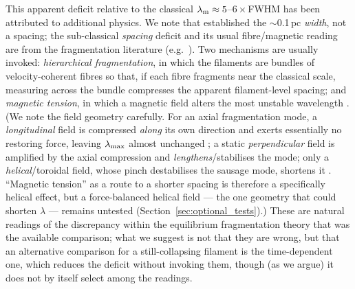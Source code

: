 \documentclass[usenatbib,twoside,twocolumn]{mnras}
\begin{document}
This apparent deficit relative to the classical $\lambda_{\rm m}\approx5$--$6\times$FWHM has been attributed to additional physics. We note that \citet{Arzoumanian2019} established the $\sim$0.1\,pc \emph{width}, not a spacing; the sub-classical \emph{spacing} deficit and its usual fibre/magnetic reading are from the fragmentation literature (e.g.\ \citealt{Fischera2012,Zhang2023cal}). Two mechanisms are usually invoked: \emph{hierarchical fragmentation}, in which the filaments are bundles of velocity-coherent fibres \citep{Hacar2013,Hacar2018,Yang2024} so that, if each fibre fragments near the classical scale, measuring across the bundle compresses the apparent filament-level spacing; and \emph{magnetic tension}, in which a magnetic field alters the most unstable wavelength \citep{Nakamura1993}. (We note the field geometry carefully. For an axial fragmentation mode, a \emph{longitudinal} field is compressed \emph{along} its own direction and exerts essentially no restoring force, leaving $\lambda_{\rm max}$ almost unchanged \citep[][consistent with our $\theta=0^\circ$ runs being nearly $\beta$-independent]{Nagasawa1987,Nakamura1993}; a static \emph{perpendicular} field is amplified by the axial compression and \emph{lengthens}/stabilises the mode; only a \emph{helical}/toroidal field, whose pinch destabilises the sausage mode, shortens it \citep{Fiege2000}. ``Magnetic tension'' as a route to a shorter spacing is therefore a specifically helical effect, but a force-balanced helical field --- the one geometry that could shorten $\lambda$ --- remains untested (Section~\ref{sec:optional_tests}).) These are natural readings of the discrepancy within the equilibrium fragmentation theory that was the available comparison; what we suggest is not that they are wrong, but that an alternative comparison for a still-collapsing filament is the time-dependent one, which reduces the deficit without invoking them, though (as we argue) it does not by itself select among the readings.
\end{document}
